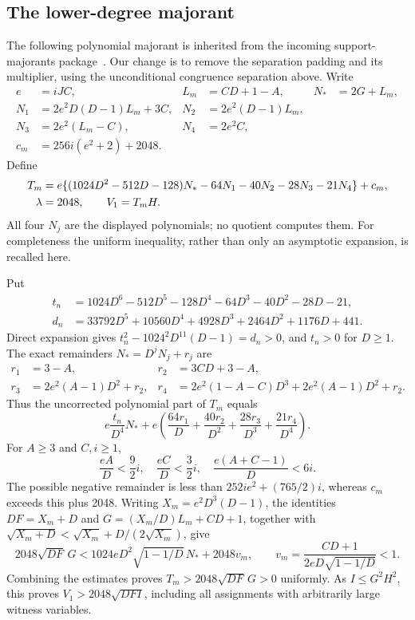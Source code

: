 \documentclass[11pt,a4paper]{article}
\theoremstyle{definition}\newtheorem{definition}[theorem]{Definition}
\theoremstyle{remark}\newtheorem{remark}[theorem]{Remark}
\begin{document}
\subsection{The lower-degree majorant}

The following polynomial majorant is inherited from the incoming
support-majorants package~\cite{majorant}. Our change is to remove the
separation padding and its multiplier, using the unconditional congruence
separation above. Write
\begin{align*}
 e&=iJC,& L_m&=CD+1-A,& N_*&=2G+L_m,\\
 N_1&=2e^2D(D-1)L_m+3C,&N_2&=2e^2(D-1)L_m,\\
 N_3&=2e^2(L_m-C),&N_4&=2e^2C,\\
 c_m&=256i(e^2+2)+2048.
\end{align*}
Define
\begin{align}
 T_m={}&e\{(1024D^2-512D-128)N_*
            -64N_1-40N_2-28N_3-21N_4\}+c_m,\notag\\
 \lambda={}&2048,\qquad V_1=T_mH.\label{eq:majorant}
\end{align}
All four $N_j$ are the displayed polynomials; no quotient computes them.
For completeness the uniform inequality, rather than only an asymptotic
expansion, is recalled here.

Put
\begin{align*}
 t_n&=1024D^6-512D^5-128D^4-64D^3-40D^2-28D-21,\\
 d_n&=33792D^5+10560D^4+4928D^3+2464D^2+1176D+441.
\end{align*}
Direct expansion gives
$t_n^2-1024^2D^{11}(D-1)=d_n>0$, and $t_n>0$ for $D\ge1$.
The exact remainders $N_*=D^jN_j+r_j$ are
\begin{align*}
 r_1&=3-A,&r_2&=3CD+3-A,\\
 r_3&=2e^2(A-1)D^2+r_2,&
 r_4&=2e^2(1-A-C)D^3+2e^2(A-1)D^2+r_2.
\end{align*}
Thus the uncorrected polynomial part of $T_m$ equals
\[
 e\frac{t_n}{D^4}N_*+
 e\left(\frac{64r_1}{D}+\frac{40r_2}{D^2}
        +\frac{28r_3}{D^3}+\frac{21r_4}{D^4}\right).
\]
For $A\ge3$ and $C,i\ge1$,
\[
 \frac{eA}{D}<\frac92i,\quad
 \frac{eC}{D}<\frac32i,\quad
 \frac{e(A+C-1)}D<6i.
\]
The possible negative remainder is less than
$252ie^2+(765/2)i$, whereas $c_m$ exceeds this plus 2048.
Writing $X_m=e^2D^3(D-1)$, the identities
$DF=X_m+D$ and $G=(X_m/D)L_m+CD+1$, together with
$\sqrt{X_m+D}<\sqrt{X_m}+D/(2\sqrt{X_m})$, give
\[
 2048\sqrt{DF}\,G
 <1024eD^2\sqrt{1-1/D}\,N_*+2048v_m,
 \qquad v_m=\frac{CD+1}{2eD\sqrt{1-1/D}}<1.
\]
Combining the estimates proves $T_m>2048\sqrt{DF}\,G>0$ uniformly.
As $I\le G^2H^2$, this proves $V_1>2048\sqrt{DFI}$, including all
assignments with arbitrarily large witness variables.
\end{document}
